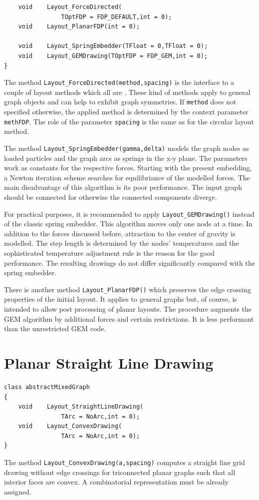 \documentclass[a4paper,11pt,twoside]{book}
\begin{document}
\begin{multicols}{2}
\begin{mymethods}
\begin{verbatim}
    void    Layout_ForceDirected(
                TOptFDP = FDP_DEFAULT,int = 0);
    void    Layout_PlanarFDP(int = 0);

    void    Layout_SpringEmbedder(TFloat = 0,TFloat = 0);
    void    Layout_GEMDrawing(TOptFDP = FDP_GEM,int = 0);
}
\end{verbatim}
\end{mymethods}
The method \verb/Layout_ForceDirected(method,spacing)/ is the interface to a
couple of layout methods which all are . These kind of
methods apply to general graph objects and can help to exhibit graph symmetries.
If \verb/method/ does not specified otherwise, the applied method is determined
by the context parameter \verb/methFDP/. The role of the parameter
\verb/spacing/ is the same as for the circular layout method.

The method \verb/Layout_SpringEmbedder(gamma,delta)/ models the graph nodes as
loaded particles and the graph arcs as springs in the x-y plane. The parameters
work as constants for the respective forces. Starting with the present
embedding, a Newton iteration scheme searches for equilibriance of the modelled
forces. The main disadvantage of this algorithm is its poor performance. The
input graph should be connected for otherwise the connected components diverge.

For practical purposes, it is recommended to apply \verb/Layout_GEMDrawing()/
instead of the classic spring embedder. This algorithm moves only one node at a
time. In addition to the forces discussed before, attraction to the center of
gravity is modelled. The step length is determined by the nodes' temperatures
and the sophisticated temperature adjustment rule is the reason for the good
performance. The resulting drawings do not differ significantly compared with
the spring embedder.

There is another method \verb/Layout_PlanarFDP()/ which preserves the edge
crossing properties of the initial layout. It applies to general graphs but, of
course, is intended to allow post processing of planar layouts. The procedure
augments the GEM algorithm by additional forces and certain restrictions.
It is less performant than the unrestricted GEM code.


\section{Planar Straight Line Drawing}
\begin{mymethods}
\begin{verbatim}
class abstractMixedGraph
{
    void    Layout_StraightLineDrawing(
                TArc = NoArc,int = 0);
    void    Layout_ConvexDrawing(
                TArc = NoArc,int = 0);
}
\end{verbatim}
\end{mymethods}
The method \verb/Layout_ConvexDrawing(a,spacing)/ computes a straight line grid
drawing without edge crossings for triconnected planar graphs such that all
interior faces are convex. A combinatorial representation must be already assigned.


\end{multicols}
\end{document}
